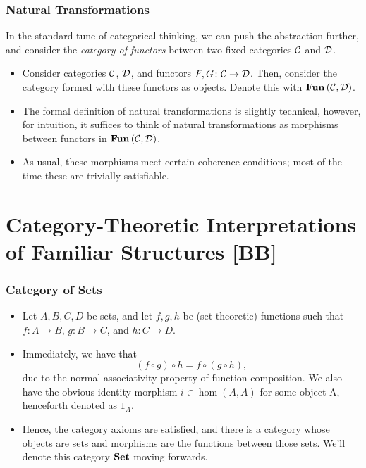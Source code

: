 \documentclass{beamer}
\numberwithin{figure}{section}
\begin{document}
\begin{frame}
        \frametitle{Natural Transformations}
        In the standard tune of categorical thinking, we can push the
        abstraction further, and consider the \emph{category of functors}
        between two fixed categories $\mathcal{C}$ and $\mathcal{D}$.
        \pause
        \begin{itemize}
                \item Consider categories $\mathcal{C}$, $\mathcal{D}$, and
                        functors $F, G \colon \mathcal{C} \to \mathcal{D}$. Then,
                        consider the category formed with these functors as
                        objects. Denote this with
                        $\operatorname{\mathbf{Fun}}{(\mathcal{C},\mathcal{D})}$.
                \item The formal definition of natural transformations is
                        slightly technical, however, for intuition, it suffices
                        to think of natural transformations as morphisms between
                        functors in $\operatorname{\mathbf{Fun}}{(\mathcal{C},\mathcal{D})}$.
                \item As usual, these morphisms meet certain coherence
                        conditions; most of the time these are trivially
                        satisfiable.
        \end{itemize}
\end{frame}

%
\section{Category-Theoretic Interpretations of Familiar Structures [BB]}
\begin{frame}
        \frametitle{Category of Sets}
        \begin{itemize}
                \item Let $A,B,C,D$ be sets, and let $f,g,h$ be (set-theoretic)
                        functions such that $f \colon A \to B$, $g \colon B \to
                        C$, and $h \colon C \to D$.
                \item Immediately, we have that
                        \begin{equation*}
                                \left( f \circ g \right) \circ h = f \circ
                                \left( g \circ h \right),
                        \end{equation*}
                        due to the normal associativity property of function
                        composition. We also have the obvious identity morphism
                        $i \in \hom(A,A)$ for some object A, henceforth
                        denoted as $1_A$.
                \item Hence, the category axioms are satisfied, and there is a
                        category whose objects are sets and morphisms are the
                        functions between those sets. We'll denote this category
                        $\operatorname{\mathbf{Set}}$ moving forwards.
        \end{itemize}
\end{frame}
\end{document}
